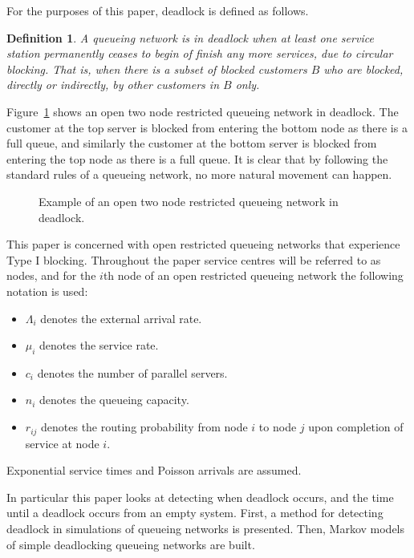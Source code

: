 \documentclass{article}
\newtheorem{definition}{Definition}
\numberwithin{equation}{section}
\begin{document}
For the purposes of this paper, deadlock is defined as follows.\\

\begin{definition}
    A queueing network is in deadlock when at least one service station
    permanently ceases to begin of finish any more services, due to circular
    blocking.
    That is, when there is a subset of blocked customers $B$ who are blocked,
    directly or indirectly, by other customers in $B$ only.
\end{definition}


Figure~\ref{fig:1st_example} shows an open two node restricted queueing
network in deadlock.
The customer at the top server is blocked from entering the bottom node as
there is a full queue, and similarly the customer at the bottom server is
blocked from entering the top node as there is a full queue.
It is clear that by following the standard rules of a queueing network, no
more natural movement can happen.

\begin{figure}[!htbp]
  \begin{center}
  
  \end{center}
  \caption{Example of an open two node restricted queueing network in deadlock.}
  \label{fig:1st_example}
\end{figure}

This paper is concerned with open restricted queueing networks that experience
Type I blocking.
Throughout the paper service centres will be referred to as nodes, and for the
$i$th node of an open restricted queueing network the following notation is
used:

\begin{itemize}
  \item $\Lambda_i$ denotes the external arrival rate.
  \item $\mu_i$ denotes the service rate.
  \item $c_i$ denotes the number of parallel servers.
  \item $n_i$ denotes the queueing capacity.
  \item $r_{ij}$ denotes the routing probability from node $i$ to node $j$
  upon completion of service at node $i$.
\end{itemize}

Exponential service times and Poisson arrivals are assumed.

In particular this paper looks at detecting when deadlock occurs, and the time
until a deadlock occurs from an empty system.
First, a method for detecting deadlock in simulations of queueing networks is
presented.
Then, Markov models of simple deadlocking queueing networks are built.
\end{document}
